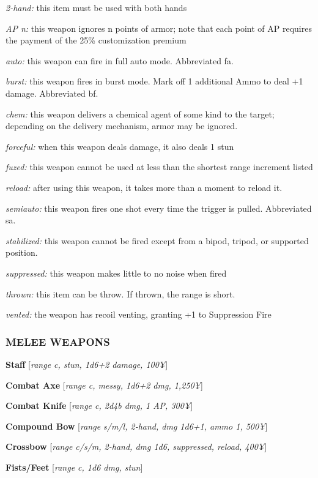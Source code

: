 \documentclass[oneside,10pt]{article}
\begin{document}
\begin{multicols}{2}
\begin{adjustwidth*}{.5cm}{.5cm}
\textit{2-hand:} this item must be used with both hands

\textit{AP n:} this weapon ignores n points of armor; note that
each point of AP requires the payment of the 25\% customization premium

\textit{auto:} this weapon can fire in full auto mode. Abbreviated
fa.

\textit{burst:} this weapon fires in burst mode. Mark off 1 additional Ammo to deal +1 damage. Abbreviated bf.

\textit{chem:} this weapon delivers a chemical agent of some kind
to the target; depending on the delivery mechanism, armor may be ignored.

\textit{forceful:} when this weapon deals damage, it also deals 1
stun

\textit{fuzed:} this weapon cannot be used at less than the shortest
range increment listed

\textit{reload:} after using this weapon, it takes more than a moment to reload it.

\textit{semiauto:} this weapon fires one shot every time the trigger
is pulled. Abbreviated sa.

\textit{stabilized:} this weapon cannot be fired except from a bipod, tripod, or supported position.

\textit{suppressed:} this weapon makes little to no noise when
fired

\textit{thrown:} this item can be throw. If thrown, the range is
short.

\textit{vented:} the weapon has recoil venting, granting +1 to
Suppression Fire
\end{adjustwidth*}

\subsubsection{MELEE WEAPONS}
\textbf{Staff} [\textit{range c, stun, 1d6+2
  damage, 100¥}]

\textbf{Combat Axe} [\textit{range c, messy, 1d6+2
  dmg, 1,250¥}]

\textbf{Combat Knife} [\textit{range c, 2d4b dmg,
  1 AP, 300¥}]

\textbf{Compound Bow} [\textit{range s/m/l, 2-hand, dmg 1d6+1, ammo
1, 500¥}]

\textbf{Crossbow} [\textit{range c/s/m, 2-hand, dmg 1d6, suppressed, reload, 400¥}]

\textbf{Fists/Feet} [\textit{range c, 1d6 dmg,
  stun}]


\end{multicols}
\end{document}
